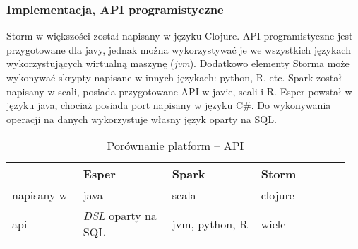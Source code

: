 \subsubsection*{Implementacja, API programistyczne}
Storm w większości został napisany w języku Clojure.
API programistyczne jest przygotowane dla javy,
jednak można wykorzystywać je we wszystkich językach wykorzystujących wirtualną maszynę (\textit{jvm}).
Dodatkowo elementy Storma może wykonywać skrypty napisane w innych językach: python, R, etc.
Spark został napisany w scali,
posiada przygotowane API w javie, scali i R.
Esper powstał w języku java, chociaż posiada port napisany w języku C\#.
Do wykonywania operacji na danych wykorzystuje własny język oparty na SQL.
\begin{table}[h]
  \label{tab:ProgrammingApi}
  \begin{tabular}{p{0.2\linewidth} p{0.25\linewidth} p{0.25\linewidth} p{0.25\linewidth}}
    & Esper & Spark & Storm \\
    \hline
    napisany w & java & scala & clojure \\
    api & \textit{DSL} oparty na SQL & jvm, python, R & wiele \\
  \end{tabular}
  \caption{Porównanie platform -- API}
\end{table}
